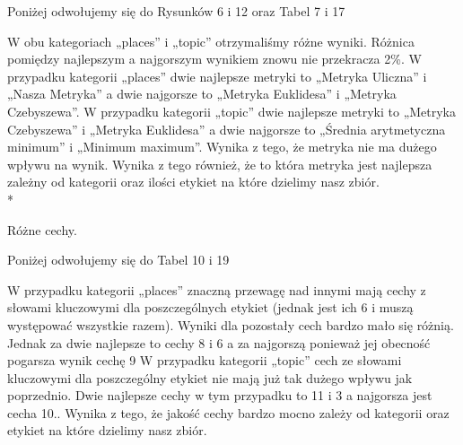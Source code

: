 \documentclass{classrep}
\begin{document}
{Poniżej odwołujemy się do Rysunków 6 i 12 oraz Tabel 7 i 17

W obu kategoriach „places” i „topic” otrzymaliśmy różne wyniki. Różnica pomiędzy najlepszym a najgorszym wynikiem znowu nie przekracza 2\%. W przypadku kategorii „places” dwie najlepsze metryki to „Metryka Uliczna” i „Nasza Metryka” a dwie najgorsze to „Metryka Euklidesa” i „Metryka Czebyszewa”. W przypadku kategorii „topic” dwie najlepsze metryki to „Metryka Czebyszewa” i „Metryka Euklidesa” a dwie najgorsze to „Średnia arytmetyczna minimum” i „Minimum maximum”. Wynika z tego, że metryka nie ma dużego wpływu na wynik. Wynika z tego również, że to która metryka jest najlepsza zależny od kategorii oraz ilości etykiet na które dzielimy nasz zbiór.
\\*
\par Różne cechy.

Poniżej odwołujemy się do Tabel 10 i 19

W przypadku kategorii „places” znaczną przewagę nad innymi mają cechy z słowami kluczowymi dla poszczególnych etykiet (jednak jest ich 6 i muszą występować wszystkie razem). Wyniki dla pozostały cech bardzo mało się różnią. Jednak za dwie najlepsze to cechy 8 i 6 a za najgorszą ponieważ jej obecność pogarsza wynik cechę 9 W przypadku kategorii „topic” cech ze słowami kluczowymi dla poszczególny etykiet nie mają już tak dużego wpływu jak poprzednio. Dwie najlepsze cechy w tym przypadku to 11 i 3 a najgorsza jest cecha 10.. Wynika z tego, że jakość cechy bardzo mocno zależy od kategorii oraz etykiet na które dzielimy nasz zbiór. 
}
\end{document}
